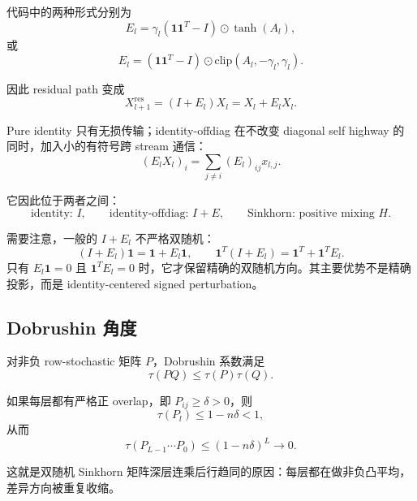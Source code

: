 \documentclass[UTF8,11pt]{ctexart}
\newcommand{\one}{\mathbf{1}}
\begin{document}
代码中的两种形式分别为
\begin{equation}
  E_l=
  \gamma_l(\one\one^T-I)\odot\tanh(A_l),
\end{equation}
或
\begin{equation}
  E_l=
  (\one\one^T-I)\odot\mathrm{clip}(A_l,-\gamma_l,\gamma_l).
\end{equation}

因此 residual path 变成
\begin{equation}
  X_{l+1}^{\mathrm{res}}
  =
  (I+E_l)X_l
  =
  X_l+E_lX_l.
\end{equation}

Pure identity 只有无损传输；identity-offdiag 在不改变 diagonal self highway 的同时，加入小的有符号跨 stream 通信：
\begin{equation}
  (E_lX_l)_i
  =
  \sum_{j\ne i}(E_l)_{ij}x_{l,j}.
\end{equation}

它因此位于两者之间：
\begin{equation}
  \text{identity: } I,
  \qquad
  \text{identity-offdiag: } I+E,
  \qquad
  \text{Sinkhorn: positive mixing } H.
\end{equation}

需要注意，一般的 $I+E_l$ 不严格双随机：
\begin{equation}
  (I+E_l)\one=
  \one+E_l\one,
  \qquad
  \one^T(I+E_l)=
  \one^T+\one^TE_l.
\end{equation}
只有 $E_l\one=0$ 且 $\one^TE_l=0$ 时，它才保留精确的双随机方向。其主要优势不是精确投影，而是 identity-centered signed perturbation。

\subsection*{Dobrushin 角度}

对非负 row-stochastic 矩阵 $P$，Dobrushin 系数满足
\begin{equation}
  \tau(PQ)
  \le
  \tau(P)\tau(Q).
\end{equation}

如果每层都有严格正 overlap，即 $P_{ij}\ge\delta>0$，则
\begin{equation}
  \tau(P_l)
  \le
  1-n\delta
  <1,
\end{equation}
从而
\begin{equation}
  \tau(P_{L-1}\cdots P_0)
  \le
  (1-n\delta)^L
  \to 0.
\end{equation}

这就是双随机 Sinkhorn 矩阵深层连乘后行趋同的原因：每层都在做非负凸平均，差异方向被重复收缩。
\end{document}
